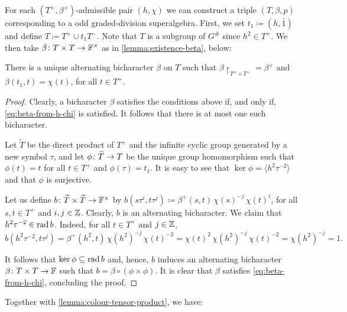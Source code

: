 For each $(T^+, \beta^+)$-admissible pair $(h, \chi)$ we can construct a triple $(T, \beta, p)$ corresponding to a odd graded-division superalgebra. 
First, we set $t_1 \coloneqq (h, \bar 1)$ and define $T \coloneqq T^+ \cup t_1 T^-$. 
Note that $T$ is a subgroup of $G^\#$ since $h^2 \in T^+$. 
We then take $\beta\colon T\times T \to \mathbb{F}^\times$ as in \cref{lemma:existence-beta}, below:

\begin{lemma}\label{lemma:existence-beta}
    There is a unique alternating bicharacter $\beta$ on $T$ such that $\beta\restriction_{T^+ \times T^+} = \beta^+$ and $\beta(t_1, t) = \chi(t)$, for all $t\in T^+$.
\end{lemma}

\begin{proof}
    Clearly, a bicharacter $\beta$ satisfies the conditions above if, and only if, \cref{eq:beta-from-h-chi} is satisfied. 
    It follows that there is at most one such bicharacter. 
    
    
    Let $\widetilde T$ be the direct product of $T^+$ and the infinite cyclic group generated by a new symbol $\tau$, and let $\phi \colon \widetilde T \to T$ be the unique group homomorphism such that $\phi(t) = t$ for all $t\in T^+$ and $\phi(\tau) = t_1$. 
    It is easy to see that $\ker \phi = \langle h^2 \tau^{-2} \rangle$ and that $\phi$ is surjective. 
    
    Let us define $b\colon \widetilde T\times \widetilde T \rightarrow \mathbb{F}^\times$ by $b(s\tau^i,t\tau^j) \coloneqq \beta^+(s,t)\, \chi (s)^{-j}\, \chi (t)^i$, for all $s,t\in T^+$ and $i,j \in \mathbb{Z}$. 
    Clearly, $b$ is an alternating bicharacter. 
    We claim that $h^2 \tau^{-2} \in \operatorname{rad} b$. 
    Indeed, for all $t \in T^+$ and $j \in \mathbb{Z}$,
    \[%
        b(h^2 \tau^{-2},t\tau^j) = \beta^+(h^2,t)\, \chi (h^2)^{-j}\, \chi (t)^{-2} = \chi (t)^{2}\, \chi (h^2)^{-j}\, \chi (t)^{-2} = \chi (h^2)^{-j} = 1.
    \]%
    
    It follows that $\ker \phi \subseteq \operatorname{rad} b$ and, hence, $b$ induces an alternating bicharacter $\beta\colon T\times T \to \mathbb{F}$ such that $b = \beta \circ (\phi \times \phi)$. 
    It is clear that $\beta$ satisfies \cref{eq:beta-from-h-chi}, concluding the proof.
\end{proof}

Together with \cref{lemma:colour-tensor-product}, we have:

